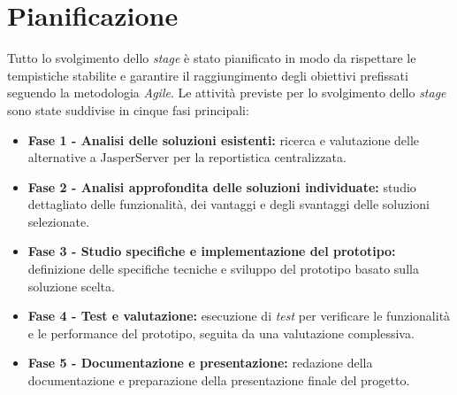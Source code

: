 \section{Pianificazione}
Tutto lo svolgimento dello \emph{stage} è stato pianificato in modo da rispettare le tempistiche stabilite e garantire il raggiungimento degli obiettivi prefissati seguendo la metodologia \emph{Agile}.
Le attività previste per lo svolgimento dello \emph{stage} sono state suddivise in cinque fasi principali:
\begin{itemize}
    \item \textbf{Fase 1 - Analisi delle soluzioni esistenti:} ricerca e valutazione delle alternative a JasperServer per la reportistica centralizzata.
    \item \textbf{Fase 2 - Analisi approfondita delle soluzioni individuate:} studio dettagliato delle funzionalità, dei vantaggi e degli svantaggi delle soluzioni selezionate.
    \item \textbf{Fase 3 - Studio specifiche e implementazione del prototipo:} definizione delle specifiche tecniche e sviluppo del prototipo basato sulla soluzione scelta.
    \item \textbf{Fase 4 - Test e valutazione:} esecuzione di \emph{test} per verificare le funzionalità e le performance del prototipo, seguita da una valutazione complessiva.
    \item \textbf{Fase 5 - Documentazione e presentazione:} redazione della documentazione e preparazione della presentazione finale del progetto.
\end{itemize}